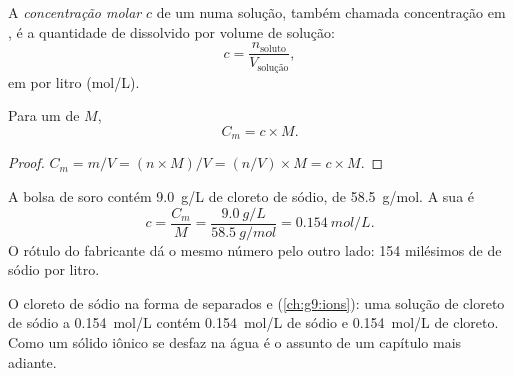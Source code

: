\begin{definition}\label{def:g10:concentration-and-dilution:molar-concentration}
A \emph{concentração molar} $c$ de um 
numa solução, também chamada concentração em , é
a quantidade de  dissolvido por volume de solução:
\[
  c = \frac{n_{\text{soluto}}}{V_{\text{solução}}},
\]
em  por litro (\si{mol/L}).
\end{definition}

\begin{proposition}\label{prop:g10:concentration-and-dilution:link}
Para um  de  $M$,
\[
  C_m = c \times M .
\]
\end{proposition}

\begin{proof}
$C_m = m / V = (n \times M) / V = (n / V) \times M = c \times M$.
\end{proof}

\begin{example}\label{ex:g10:concentration-and-dilution:drip}
A bolsa de soro contém \qty{9.0}{g/L} de cloreto de sódio, de  \qty{58.5}{g/mol}. A sua  é
\[
  c = \frac{C_m}{M} = \frac{\qty{9.0}{g/L}}{\qty{58.5}{g/mol}}
    = \qty{0.154}{mol/L}.
\]
O rótulo do fabricante dá o mesmo número pelo outro lado: 154 milésimos
de  de  sódio por litro.
\end{example}

\begin{remark}\label{rem:g10:concentration-and-dilution:ions}
O cloreto de sódio  na forma de  separados  e
 (\cref{ch:g9:ions}): uma solução de cloreto de sódio a
\qty{0.154}{mol/L} contém \qty{0.154}{mol/L} de  sódio e
\qty{0.154}{mol/L} de  cloreto. Como um sólido iônico se desfaz na
água é o assunto de um capítulo mais adiante.
\end{remark}

